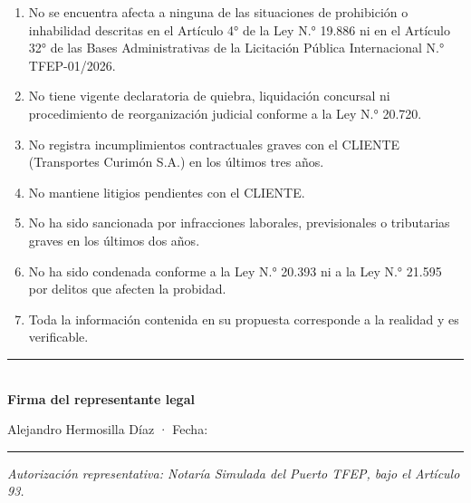 \documentclass{audit-oferta}
\newcommand\lineaFirmaSobreUno{%
  \par\vspace{9mm}\noindent\rule{48mm}{0.4pt}\\
  \textbf{Firma del representante legal}\par}
\begin{document}
\begin{enumerate}
  \item No se encuentra afecta a ninguna de las situaciones de prohibición o inhabilidad descritas en el Artículo 4° de la Ley N.° 19.886 ni en el Artículo 32° de las Bases Administrativas de la Licitación Pública Internacional N.° TFEP-01/2026.
  \item No tiene vigente declaratoria de quiebra, liquidación concursal ni procedimiento de reorganización judicial conforme a la Ley N.° 20.720.
  \item No registra incumplimientos contractuales graves con el CLIENTE (Transportes Curimón S.A.) en los últimos tres años.
  \item No mantiene litigios pendientes con el CLIENTE.
  \item No ha sido sancionada por infracciones laborales, previsionales o tributarias graves en los últimos dos años.
  \item No ha sido condenada conforme a la Ley N.° 20.393 ni a la Ley N.° 21.595 por delitos que afecten la probidad.
  \item Toda la información contenida en su propuesta corresponde a la realidad y es verificable.
\end{enumerate}

\lineaFirmaSobreUno
Alejandro Hermosilla Díaz · Fecha: \rule{25mm}{0.4pt}

\textit{Autorización representativa: Notaría Simulada del Puerto TFEP, bajo el Artículo 93.}
\label{sec:s1-a2-fin}
\end{document}
